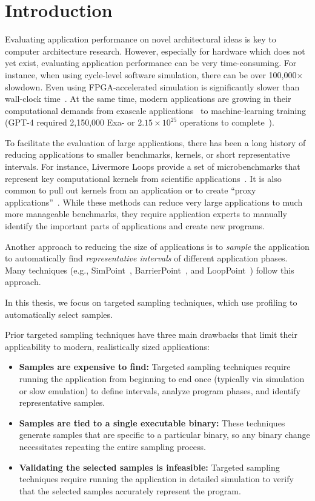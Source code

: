 \section{Introduction}
\label{sec:introduction}

Evaluating application performance on novel architectural ideas is key to computer architecture research.
However, especially for hardware which does not yet exist, evaluating application performance can be very time-consuming.
For instance, when using cycle-level software simulation, there can be over 100,000$\times$ slowdown.
Even using FPGA-accelerated simulation is significantly slower than wall-clock time~\cite{firesim}.
At the same time, modern applications are growing in their computational demands from exascale applications~\cite{exascale} to machine-learning training (GPT-4 required 2,150,000 Exa- or $2.15 \times 10^{25}$ operations to complete~\cite{epoch2024trackinglargescaleaimodels}).

To facilitate the evaluation of large applications, there has been a long history of reducing applications to smaller benchmarks, kernels, or short representative intervals.
For instance, Livermore Loops provide a set of microbenchmarks that represent key computational kernels from scientific applications~\cite{livermore_loops}.
It is also common to pull out kernels from an application or to create ``proxy applications''~\cite{exascale-proxy-apps}.
While these methods can reduce very large applications to much more manageable benchmarks, they require application experts to manually identify the important parts of applications and create new programs.

Another approach to reducing the size of applications is to \emph{sample} the application to automatically find \emph{representative intervals} of different application phases.
Many techniques (e.g., SimPoint~\cite{simpoint}, BarrierPoint~\cite{barrier_point}, and LoopPoint~\cite{looppoint}) follow this approach.

In this thesis, we focus on targeted sampling techniques, which use profiling to automatically select samples.

Prior targeted sampling techniques have three main drawbacks that limit their applicability to modern, realistically sized applications:

\begin{itemize}
    \item \textbf{Samples are expensive to find:} Targeted sampling techniques require running the application from beginning to end once (typically via simulation or slow emulation) to define intervals, analyze program phases, and identify representative samples.
    \item \textbf{Samples are tied to a single executable binary:} These techniques generate samples that are specific to a particular binary, so any binary change necessitates repeating the entire sampling process.
    \item \textbf{Validating the selected samples is infeasible:} Targeted sampling techniques require running the application in detailed simulation to verify that the selected samples accurately represent the program.
\end{itemize}

